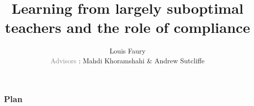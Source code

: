 \documentclass[t]{beamer}
\begin{document}
\title[Learning from largely suboptimal teachers - a compliance approach]{Learning from largely suboptimal teachers and the role of compliance}
\author[]{Louis Faury\\ \vspace{5pt} \small{\textcolor{gray}{Advisors} : Mahdi Khoramshahi \& Andrew Sutcliffe}}
\newenvironment{subenv}{\only{\setbeamercolor{local structure}{fg=red}}}{}
\graphicspath{{../report/Images/}}
\titlepage

\begin{frame}[t]
	\vspace{-3ex}
	\frametitle{Plan}
  	\tableofcontents
\end{frame}
\end{document}
